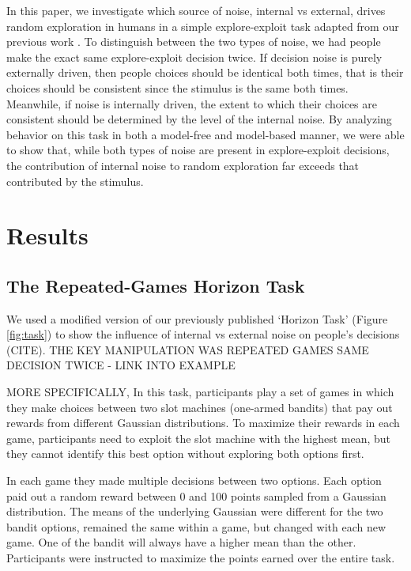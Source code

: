\documentclass[12pt]{article}
\begin{document}
	In this paper, we investigate which source of noise, internal vs external, drives random exploration in humans in a simple explore-exploit task adapted from our previous work \cite{}. To distinguish between the two types of noise, we had people make the exact same explore-exploit decision twice. If decision noise is purely externally driven, then people choices should be identical both times, that is their choices should be consistent since the stimulus is the same both times. Meanwhile, if noise is internally driven, the extent to which their choices are consistent should be determined by the level of the internal noise. By analyzing behavior on this task in both a model-free and model-based manner, we were able to show that, while both types of noise are present in explore-exploit decisions, the contribution of internal noise to random exploration far exceeds that contributed by the stimulus.
	
	
	\section*{Results}
	
	\subsection*{The Repeated-Games Horizon Task}
	We used a modified version of our previously published `Horizon Task' (Figure \ref{fig:task}) to show the influence of internal vs external noise on people's decisions (CITE). THE KEY MANIPULATION WAS REPEATED GAMES SAME DECISION TWICE - LINK INTO EXAMPLE
	
	MORE SPECIFICALLY, 
	In this task, participants play a set of games in which they make choices between two slot machines (one-armed bandits) that pay out rewards from different Gaussian distributions. To maximize their rewards in each game, participants need to exploit the slot machine with the highest mean, but they cannot identify this best option without exploring both options first. 
	
	In each game they made multiple decisions between two options. Each option paid out a random reward between 0 and 100 points sampled from a Gaussian distribution. The means of the underlying Gaussian were different for the two bandit options, remained the same within a game, but changed with each new game. One of the bandit will always have a higher mean than the other. Participants were instructed to maximize the points earned over the entire task.
	
\end{document}
